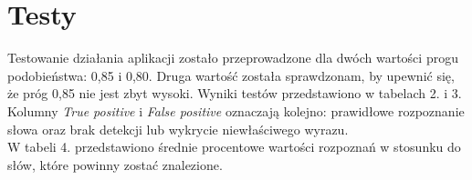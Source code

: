 \section{Testy}

Testowanie działania aplikacji zostało przeprowadzone dla dwóch wartości progu podobieństwa: 0,85 i 0,80. Druga wartość została sprawdzonam, by upewnić się, że próg 0,85 nie jest zbyt wysoki. Wyniki testów przedstawiono w tabelach 2. i 3. Kolumny \textit{True positive} i \textit{False positive} oznaczają kolejno: prawidłowe rozpoznanie słowa oraz brak detekcji lub wykrycie niewłaściwego wyrazu.\\
W tabeli 4. przedstawiono średnie procentowe wartości rozpoznań w stosunku do słów, które powinny zostać znalezione.


\begin{table}
	\centering
	\caption{Wyniki dla progu podobieństwa 0,85}
\end{table}

